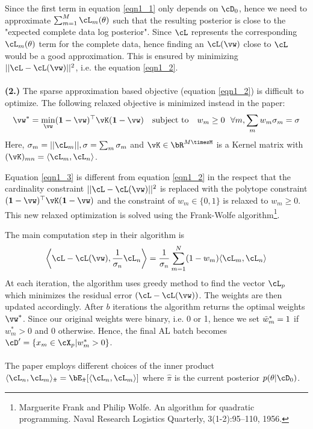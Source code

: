 \documentclass[a4paper,11pt]{article}
\begin{document}
\begin{pmisolution}
Since the first term in equation \ref{eqn1_1} only depends on $\cD_0$, hence we need to approximate $\sum_{m=1}^{M} \cL_m(\theta)$ such that the resulting posterior is close to the "expected complete data log posterior". Since $\cL$ represents the corresponding $\cL_m(\theta)$ term for the complete data, hence finding an $\cL(\vw)$ close to $\cL$ would be a good approximation. This is ensured by minimizing $|| \cL - \cL(\vw) ||^2$, i.e. the equation \ref{eqn1_2}.
\\ \\
\noindent \textbf{(2.) } The sparse approximation based objective (equation \ref{eqn1_2}) is difficult to optimize. The following relaxed objective is minimized instead in the paper:
\begin{equation}
\label{eqn1_3}
    \vw^* = \min_\vw (\textbf{1} - \vw)^\top \vK (\textbf{1} - \vw) \text{~~ subject to ~~} w_m \geq 0 ~~ \forall m, \sum_m w_m\sigma_m = \sigma
\end{equation}
Here, $\sigma_m = || \cL_m ||, \sigma = \sum_m\sigma_m$ and $\vK \in \bR^{M\timesM}$ is a Kernel matrix with $(\vK)_{mn} = \langle\cL_m, \cL_n \rangle$.

Equation \ref{eqn1_3} is different from equation \ref{eqn1_2} in the respect that the cardinality constraint $ || \cL - \cL(\vw) || ^2$ is replaced with the polytope constraint $(\textbf{1} - \vw)^\top \vK (\textbf{1} - \vw)$ and the constraint of $w_m \in \{0,1\}$ is relaxed to $w_m \geq 0$. This new relaxed optimization is solved using the Frank-Wolfe algorithm\footnote{Marguerite Frank and Philip Wolfe. An algorithm for quadratic programming. Naval Research Logistics Quarterly, 3(1-2):95–110, 1956.}.

The main computation step in their algorithm is 
\begin{equation*}
    \left\langle \cL - \cL(\vw), \frac{1}{\sigma_n}\cL_n \right\rangle = \frac{1}{\sigma_n} \sum_{m=1}^N (1 - w_m)\langle \cL_m, \cL_n \rangle
\end{equation*}
At each iteration, the algorithm uses greedy method to find the vector $\cL_p$ which minimizes the residual error $(\cL - \cL(\vw))$. The weights are then updated accordingly. After $b$ iterations the algorithm returns the optimal weights $\vw^*$. Since our original weights were binary, i.e. 0 or 1, hence we set $\Tilde{w}_m^* = 1$ if $w_m^* > 0$ and 0 otherwise. Hence, the final AL batch becomes $\cD' = \{x_m \in \cX_p | w_m^* > 0\}$.
\\ \\
\noindent The paper employs different choices of the inner product $\langle\cL_n, \cL_m \rangle_{\hat{\pi}} = \bE_{\hat{\pi}}[\langle \cL_n, \cL_m \rangle]$ where $\hat{\pi}$ is the current posterior $p(\theta|\cD_0)$.


\end{pmisolution}
\end{document}
